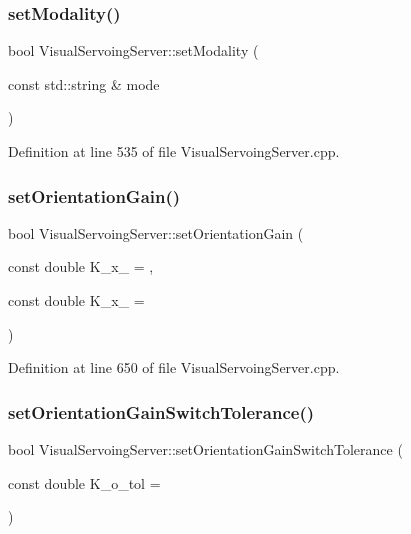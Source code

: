 \subsubsection{\texorpdfstring{set\+Modality()}{setModality()}}
{\footnotesize\ttfamily bool Visual\+Servoing\+Server\+::set\+Modality (\begin{DoxyParamCaption}\item[{const std\+::string \&}]{mode }\end{DoxyParamCaption})\hspace{0.3cm}{\ttfamily [override]}}



Definition at line 535 of file Visual\+Servoing\+Server.\+cpp.

\mbox{\label{classVisualServoingServer_afb7ac6f85a55f928aa75134ba0ad1d79}} 
\subsubsection{\texorpdfstring{set\+Orientation\+Gain()}{setOrientationGain()}}
{\footnotesize\ttfamily bool Visual\+Servoing\+Server\+::set\+Orientation\+Gain (\begin{DoxyParamCaption}\item[{const double}]{K\+\_\+x\+\_ = {},  }\item[{const double}]{K\+\_\+x\+\_ = {} }\end{DoxyParamCaption})\hspace{0.3cm}{\ttfamily [override]}}



Definition at line 650 of file Visual\+Servoing\+Server.\+cpp.

\mbox{\label{classVisualServoingServer_a5a32f1ee99bff8b8a34d3825c30ffffc}} 
\subsubsection{\texorpdfstring{set\+Orientation\+Gain\+Switch\+Tolerance()}{setOrientationGainSwitchTolerance()}}
{\footnotesize\ttfamily bool Visual\+Servoing\+Server\+::set\+Orientation\+Gain\+Switch\+Tolerance (\begin{DoxyParamCaption}\item[{const double}]{K\+\_\+o\+\_\+tol = {} }\end{DoxyParamCaption})\hspace{0.3cm}{\ttfamily [override]}}



